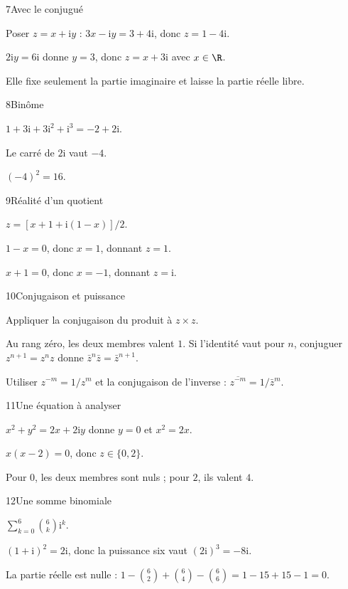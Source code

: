 \begin{corrige}{7}{Avec le conjugué}
\begin{questions}
\item Poser $z=x+\mathrm iy$ : $3x-\mathrm iy=3+4\mathrm i$, donc $z=1-4\mathrm i$.
\item $2\mathrm iy=6\mathrm i$ donne $y=3$, donc $z=x+3\mathrm i$ avec $x\in\R$.
\item Elle fixe seulement la partie imaginaire et laisse la partie réelle libre.
\end{questions}
\end{corrige}
\begin{corrige}{8}{Binôme}
\begin{questions}
\item $1+3\mathrm i+3\mathrm i^2+\mathrm i^3=-2+2\mathrm i$.
\item Le carré de $2\mathrm i$ vaut $-4$.
\item $(-4)^2=16$.
\end{questions}
\end{corrige}
\begin{corrige}{9}{Réalité d’un quotient}
\begin{questions}
\item $z=[x+1+\mathrm i(1-x)]/2$.
\item $1-x=0$, donc $x=1$, donnant $z=1$.
\item $x+1=0$, donc $x=-1$, donnant $z=\mathrm i$.
\end{questions}
\end{corrige}
\begin{corrige}{10}{Conjugaison et puissance}
\begin{questions}
\item Appliquer la conjugaison du produit à $z\times z$.
\item Au rang zéro, les deux membres valent $1$. Si l’identité vaut pour $n$, conjuguer $z^{n+1}=z^nz$ donne $\bar z^n\bar z=\bar z^{n+1}$.
\item Utiliser $z^{-m}=1/z^m$ et la conjugaison de l’inverse : $\overline{z^{-m}}=1/\bar z^m$.
\end{questions}
\end{corrige}
\begin{corrige}{11}{Une équation à analyser}
\begin{questions}
\item $x^2+y^2=2x+2\mathrm iy$ donne $y=0$ et $x^2=2x$.
\item $x(x-2)=0$, donc $z\in\{0,2\}$.
\item Pour $0$, les deux membres sont nuls ; pour $2$, ils valent $4$.
\end{questions}
\end{corrige}
\begin{corrige}{12}{Une somme binomiale}
\begin{questions}
\item $\sum_{k=0}^6\binom6k\mathrm i^k$.
\item $(1+\mathrm i)^2=2\mathrm i$, donc la puissance six vaut $(2\mathrm i)^3=-8\mathrm i$.
\item La partie réelle est nulle : $1-\binom62+\binom64-\binom66=1-15+15-1=0$.
\end{questions}
\end{corrige}
